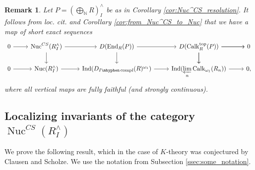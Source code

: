 \documentclass[11pt,leqno]{amsart}
\newtheorem{prop}[theo]{Proposition}
\newtheorem{remark}[theo]{Remark}
\numberwithin{equation}{section}
\def\N{\mathbb{N}}
\def\Z{\mathbb{Z}}
\def\End{\operatorname{End}}
\newcommand{\hy}{\mhyphen}
\newcommand{\prolim}[1][]{\mathop{\varprojlim}\limits_{#1}}
\newcommand{\biggplus}[1][]{\mathop{\bigoplus}\limits_{#1}}
\newcommand{\Nuc}{\operatorname{Nuc}}
\newcommand{\topp}{\operatorname{top}}
\newcommand{\Ind}{\operatorname{Ind}}
\newcommand{\Calk}{\operatorname{Calk}}
\newcommand{\compl}{\operatorname{compl}}
\begin{document}
\begin{remark}
Let $P=(\biggplus[\N]R)^{\wedge}_I$ be as in Corollary \ref{cor:Nuc^CS_resolution}. It follows from loc. cit. and Corollary \ref{cor:from_Nuc^CS_to_Nuc} that we have a map of short exact sequences
\begin{equation*}
\begin{tikzcd}
0\ar[r] & \Nuc^{CS}(R^{\wedge}_I)\ar[r]\ar[d] & D(\End_R(P))\ar[r]\ar[d] &\ar[r]\ar[d] D(\Calk_R^{\topp}(P))\ar[r]\ar[d] & 0\\
0\ar[r] & \Nuc(R^{\wedge}_I)\ar[r] & \Ind(D_{I\hy\compl}(R)^{\omega_1})\ar[r] & \Ind(\prolim[n]\Calk_{\omega_1}(R_n))\ar[r] & 0,
\end{tikzcd}
\end{equation*}
where all vertical maps are fully faithful (and strongly continuous).
\end{remark}




\subsection{Localizing invariants of the category $\Nuc^{CS}(R^{\wedge}_I)$} We prove the following result, which in the case of $K$-theory was conjectured by Clausen and Scholze. We use the notation from Subsection \ref{ssec:some_notation}.
\end{document}
